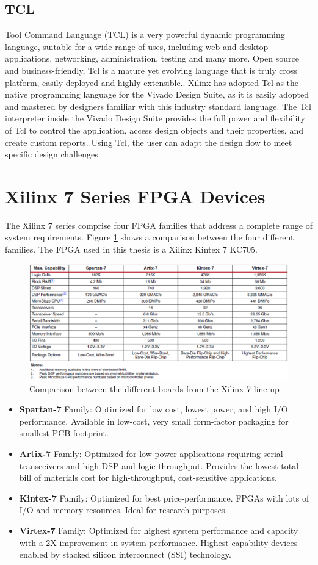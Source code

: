 \subsection{TCL}\label{tcl}
Tool Command Language (TCL) is a very powerful dynamic programming language, suitable for a wide range of uses, including web and desktop applications, networking, administration, testing and many more. Open source and business-friendly, Tcl is a mature yet evolving language that is truly cross platform, easily deployed and highly extensible.\cite{tcl}.
Xilinx has adopted Tcl as the native programming language for the Vivado Design Suite,
as it is easily adopted and mastered by designers familiar with this industry standard
language. The Tcl interpreter inside the Vivado Design Suite provides the full power and
flexibility of Tcl to control the application, access design objects and their properties, and
create custom reports. Using Tcl, the user can adapt the design flow to meet specific design
challenges.


\section{Xilinx 7 Series FPGA Devices}
\noindent The Xilinx 7 series comprise four FPGA families that address a complete range of system requirements.
Figure \ref{fig:kintex72} shows a comparison between the four different families.
The FPGA used in this thesis is a Xilinx Kintex 7 KC705\cite{xilinx7}.
\begin{figure}[H]
	\centering
	\includegraphics[width=0.8\linewidth]{IMG/ch3/KINTEX72}
	\caption{Comparison between the different boards from the Xilinx 7 line-up}
	\label{fig:kintex72}
\end{figure}
\begin{itemize}
	\item  \textbf{Spartan-7} Family: Optimized for low cost, lowest power, and high
	I/O performance. Available in low-cost, very small form-factor
	packaging for smallest PCB footprint.
	\item \textbf{Artix-7} Family: Optimized for low power applications requiring serial
	transceivers and high DSP and logic throughput. Provides the lowest
	total bill of materials cost for high-throughput, cost-sensitive
	applications.
	\item \textbf{Kintex-7} Family: Optimized for best price-performance. FPGAs with lots of I/O and memory resources. Ideal for research purposes.
	\item \textbf{Virtex-7} Family: Optimized for highest system performance and
	capacity with a 2X improvement in system performance. Highest
	capability devices enabled by stacked silicon interconnect (SSI)
	technology.
\end{itemize}
